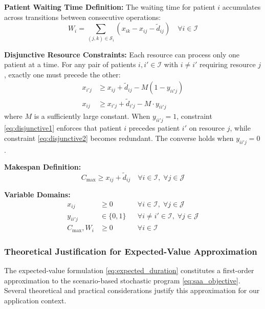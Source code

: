\documentclass[11pt,a4paper]{article}
\begin{document}
\textbf{Patient Waiting Time Definition:} The waiting time for patient $i$ accumulates across transitions between consecutive operations:
\begin{equation}
W_i = \sum_{(j,k) \in \mathcal{S}_i} \left( x_{ik} - x_{ij} - \tilde{d}_{ij} \right) \quad \forall i \in \mathcal{I}
\label{eq:wait_time}
\end{equation}

\textbf{Disjunctive Resource Constraints:} Each resource can process only one patient at a time. For any pair of patients $i, i' \in \mathcal{I}$ with $i \neq i'$ requiring resource $j$, exactly one must precede the other:
\begin{align}
x_{i'j} &\geq x_{ij} + \tilde{d}_{ij} - M(1 - y_{ii'j}) \label{eq:disjunctive1} \\
x_{ij} &\geq x_{i'j} + \tilde{d}_{i'j} - M \cdot y_{ii'j} \label{eq:disjunctive2}
\end{align}
where $M$ is a sufficiently large constant. When $y_{ii'j} = 1$, constraint \eqref{eq:disjunctive1} enforces that patient $i$ precedes patient $i'$ on resource $j$, while constraint \eqref{eq:disjunctive2} becomes redundant. The converse holds when $y_{ii'j} = 0$.

\textbf{Makespan Definition:}
\begin{equation}
C_{\max} \geq x_{ij} + \tilde{d}_{ij} \quad \forall i \in \mathcal{I}, \; \forall j \in \mathcal{J}
\label{eq:makespan}
\end{equation}

\textbf{Variable Domains:}
\begin{align}
x_{ij} &\geq 0 && \forall i \in \mathcal{I}, \; \forall j \in \mathcal{J} \\
y_{ii'j} &\in \{0, 1\} && \forall i \neq i' \in \mathcal{I}, \; \forall j \in \mathcal{J} \\
C_{\max}, W_i &\geq 0 && \forall i \in \mathcal{I}
\end{align}

\subsubsection{Theoretical Justification for Expected-Value Approximation}

The expected-value formulation \eqref{eq:expected_duration} constitutes a first-order approximation to the scenario-based stochastic program \eqref{eq:saa_objective}. Several theoretical and practical considerations justify this approximation for our application context.
\end{document}
